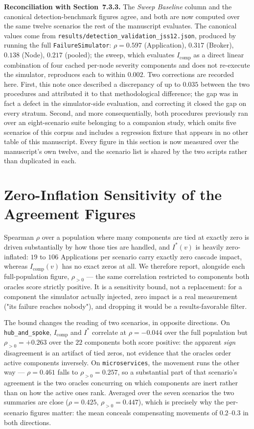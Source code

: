 \documentclass[preprint,3p]{elsarticle}
\begin{document}
\noindent\textbf{Reconciliation with Section~7.3.3.} The \emph{Sweep Baseline} column and the canonical detection-benchmark figures agree, and both are now computed over the same twelve scenarios the rest of the manuscript evaluates. The canonical values come from \texttt{results/detection\_validation\_jss12.json}, produced by running the full \texttt{FailureSimulator}: $\rho = 0.597$ (Application), $0.317$ (Broker), $0.138$ (Node), $0.217$ (pooled); the sweep, which evaluates $I_{\text{comp}}$ as a direct linear combination of four cached per-node severity components and does not re-execute the simulator, reproduces each to within $0.002$. Two corrections are recorded here. First, this note once described a discrepancy of up to $0.035$ between the two procedures and attributed it to that methodological difference; the gap was in fact a defect in the simulator-side evaluation, and correcting it closed the gap on every stratum. Second, and more consequentially, both procedures previously ran over an eight-scenario suite belonging to a companion study, which omits five scenarios of this corpus and includes a regression fixture that appears in no other table of this manuscript. Every figure in this section is now measured over the manuscript's own twelve, and the scenario list is shared by the two scripts rather than duplicated in each.

\section{Zero-Inflation Sensitivity of the Agreement Figures}
\label{supp:zeroinfl}

Spearman $\rho$ over a population where many components are tied at exactly zero is driven substantially by how those ties are handled, and $I^*(v)$ is heavily zero-inflated: $19$ to $106$ Applications per scenario carry exactly zero cascade impact, whereas $I_{\text{comp}}(v)$ has no exact zeros at all. We therefore report, alongside each full-population figure, $\rho_{>0}$ --- the same correlation restricted to components both oracles score strictly positive. It is a sensitivity bound, not a replacement: for a component the simulator actually injected, zero impact is a real measurement ("its failure reaches nobody"), and dropping it would be a results-favorable filter.

The bound changes the reading of two scenarios, in opposite directions. On \texttt{hub\_and\_spoke}, $I_{\text{comp}}$ and $I^*$ correlate at $\rho = -0.044$ over the full population but $\rho_{>0} = +0.263$ over the $22$ components both score positive: the apparent \emph{sign} disagreement is an artifact of tied zeros, not evidence that the oracles order active components inversely. On \texttt{microservices}, the movement runs the other way --- $\rho = 0.461$ falls to $\rho_{>0} = 0.257$, so a substantial part of that scenario's agreement is the two oracles concurring on which components are inert rather than on how the active ones rank. Averaged over the seven scenarios the two summaries are close ($\rho = 0.425$, $\rho_{>0} = 0.447$), which is precisely why the per-scenario figures matter: the mean conceals compensating movements of $0.2$--$0.3$ in both directions.
\end{document}
